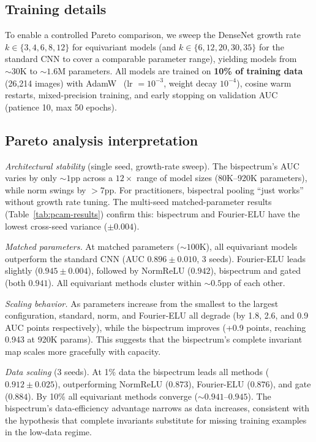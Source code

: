 \documentclass{article}
\theoremstyle{definition}
\theoremstyle{remark}
\theoremstyle{definition}
\begin{document}
\subsection{Training details}

To enable a controlled Pareto comparison, we sweep the DenseNet
growth rate $k \in \{3, 4, 6, 8, 12\}$ for equivariant models (and
$k \in \{6, 12, 20, 30, 35\}$ for the standard CNN to cover a
comparable parameter range), yielding models from ${\sim}30$K to
${\sim}1.6$M parameters. All models are trained on \textbf{10\% of
training data} (26{,}214 images) with AdamW~\citep{loshchilov2019adamw}
(lr $= 10^{-3}$, weight decay $10^{-4}$), cosine warm restarts,
mixed-precision training, and early stopping on validation AUC
(patience 10, max 50 epochs).

\subsection{Pareto analysis interpretation}

\emph{Architectural stability} (single seed, growth-rate sweep).
The bispectrum's AUC varies by only ${\sim}1$pp across a $12\times$
range of model sizes (80K--920K parameters), while norm swings by
$>$7pp. For practitioners, bispectral pooling ``just works'' without
growth rate tuning. The multi-seed matched-parameter results
(Table~\ref{tab:pcam-results}) confirm this: bispectrum and Fourier-ELU
have the lowest cross-seed variance ($\pm 0.004$).

\emph{Matched parameters.}
At matched parameters (${\sim}100$K), all equivariant models outperform
the standard CNN (AUC $0.896 \pm 0.010$, 3 seeds). Fourier-ELU leads
slightly ($0.945 \pm 0.004$), followed by NormReLU ($0.942$), bispectrum
and gated (both $0.941$). All equivariant methods cluster within
${\sim}0.5$pp of each other.

\emph{Scaling behavior.}
As parameters increase from the smallest to the largest configuration,
standard, norm, and Fourier-ELU all degrade (by 1.8, 2.6, and 0.9
AUC points respectively), while the bispectrum improves (+0.9 points,
reaching 0.943 at 920K params). This suggests that the bispectrum's
complete invariant map scales more gracefully with capacity.

\emph{Data scaling} (3 seeds).
At 1\% data the bispectrum leads all methods ($0.912 \pm 0.025$),
outperforming NormReLU ($0.873$), Fourier-ELU ($0.876$), and gate
($0.884$). By 10\% all equivariant methods converge (${\sim}0.941$--$0.945$).
The bispectrum's data-efficiency advantage narrows as data increases,
consistent with the hypothesis that complete invariants substitute for
missing training examples in the low-data regime.
\end{document}
